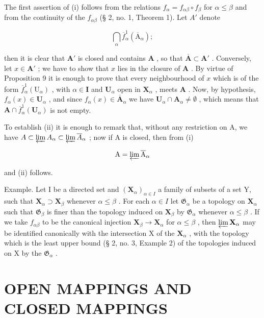 The first assertion of (i) follows from the relations \(f_{\alpha} = f_{\alpha \beta} \circ f_{\beta}\) for \(\alpha \leqslant \beta\) and from the continuity of the \(f_{\alpha \beta}\) (§ 2, no. 1, Theorem 1). Let \(A'\) denote

\[
\bigcap_ {\alpha} \overline {{f}} _ {\alpha} ^ {1} (\overline {{\mathrm{A}}} _ {\alpha});
\]

then it is clear that \(\mathbf{A}'\) is closed and contains \(\mathbf{A}\) , so that \(\overline{\mathbf{A}} \subset \mathbf{A}'\) . Conversely, let \(x \in \mathbf{A}'\) ; we have to show that \(x\) lies in the closure of \(\mathbf{A}\) . By virtue of Proposition 9 it is enough to prove that every neighbourhood of \(x\) which is of the form \(\overline{f}_{\alpha}^{1}(\mathrm{U}_{\alpha})\) , with \(\alpha \in \mathbf{I}\) and \(\mathbf{U}_{\alpha}\) open in \(\mathbf{X}_{\alpha}\) , meets \(\mathbf{A}\) . Now, by hypothesis, \(f_{\alpha}(x) \in \mathbf{U}_{\alpha}\) , and since \(f_{\alpha}(x) \in \overline{\mathbf{A}}_{\alpha}\) we have \(\mathbf{U}_{\alpha} \cap \mathbf{A}_{\alpha} \neq \emptyset\) , which means that \(\mathbf{A} \cap \overline{f}_{\alpha}^{1}(\mathbf{U}_{\alpha})\) is not empty.

To establish (ii) it is enough to remark that, without any restriction on A, we have \(A \subset \varprojlim A_{\alpha} \subset \varprojlim \overline{A}_{\alpha}\) ; now if A is closed, then from (i)

\[
\mathrm{A} = \varprojlim \overline {{\mathrm{A}}} _ {\alpha}
\]

and (ii) follows.

Example. Let I be a directed set and \((\mathbf{X}_{\alpha})_{\alpha \in I}\) a family of subsets of a set Y, such that \(\mathbf{X}_{\alpha} \supset \mathbf{X}_{\beta}\) whenever \(\alpha \leqslant \beta\) . For each \(\alpha \in I\) let \(\mathfrak{G}_{\alpha}\) be a topology on \(\mathbf{X}_{\alpha}\) such that \(\mathfrak{G}_{\beta}\) is finer than the topology induced on \(\mathbf{X}_{\beta}\) by \(\mathfrak{G}_{\alpha}\) whenever \(\alpha \leqslant \beta\) . If we take \(f_{\alpha \beta}\) to be the canonical injection \(\mathbf{X}_{\beta} \to \mathbf{X}_{\alpha}\) for \(\alpha \leqslant \beta\) , then \(\varprojlim \mathbf{X}_{\alpha}\) may be identified canonically with the intersection X of the \(\mathbf{X}_{\alpha}\) , with the topology which is the least upper bound (§ 2, no. 3, Example 2) of the topologies induced on X by the \(\mathfrak{G}_{\alpha}\) .

\section{OPEN MAPPINGS AND CLOSED MAPPINGS}

